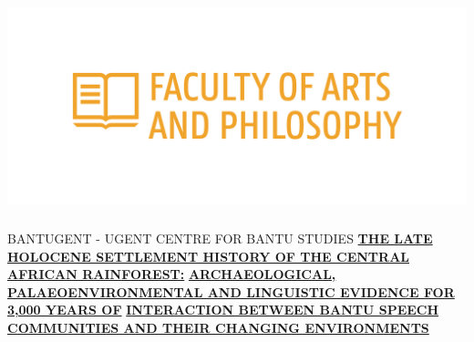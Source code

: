 \documentclass[a0]{sciposter}
\begin{document}
\vspace*{-2cm}\hspace*{-2cm}\includegraphics[width = 14.47cm, height = 6.2cm]{img/logos/icon_UGent_LW_EN_RGB_2400_color.png}

\colorbox{BoxCol}{
\begin{minipage}[t][102cm][t]{82cm}

\vspace{2cm}\hspace{2cm}\begin{minipage}[t]{77cm}
{\fontsize{50}{52}\selectfont\textcolor{HeadCol}{\uppercase{BantUGent - UGent Centre for Bantu Studies}}}
\bigbreak\bigbreak
{\fontsize{40}{44}}
\bigbreak\bigbreak
{\fontsize{44}{50}\selectfont\textcolor{HeadCol}{\uline{\textbf{\uppercase{The Late Holocene Settlement History of the Central African Rainforest:}}}}}
\bigbreak
{\fontsize{44}{50}\selectfont\textcolor{HeadCol}{\uline{\textbf{\uppercase{Archaeological, Palaeoenvironmental and Linguistic Evidence for 3,000 years of}}}}}
\bigbreak
{\fontsize{44}{50}\selectfont\textcolor{HeadCol}{\uline{\textbf{\uppercase{Interaction between Bantu Speech Communities and their Changing Environments}}}}}
\end{minipage}


\end{minipage}}
\end{document}
